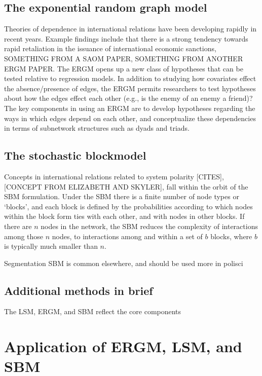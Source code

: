 \documentclass[fleqn,12pt]{wlscirep}
\begin{document}
\subsection{The exponential random graph model}

Theories of dependence in international relations have been developing rapidly in recent years. Example findings include that there is a strong tendency towards rapid retaliation in the issuance of international economic sanctions, SOMETHING FROM A SAOM PAPER, SOMETHING FROM ANOTHER ERGM PAPER.  The ERGM opens up a new class of hypotheses that can be tested relative to regression models. In addition to studying how covariates effect the absence/presence of edges, the ERGM permits researchers to test hypotheses about how the edges effect each other (e.g., is the enemy of an enemy a friend)? The key components in using an ERGM are to develop hypotheses regarding the ways in which edges depend on each other, and conceptualize these dependencies in terms of subnetwork structures such as dyads and triads.

\subsection{The stochastic blockmodel}

Concepts in international relations related to system polarity [CITES], [CONCEPT FROM ELIZABETH AND SKYLER], fall within the orbit of the SBM formulation. Under the SBM there is a finite number of node types or `blocks', and each block is defined by the probabilities according to which nodes within the block form ties with each other, and with nodes in other blocks. If there are $n$ nodes in the network, the SBM reduces the complexity of interactions among those $n$  nodes, to interactions among and within a set of $b$ blocks, where $b$ is typically much smaller than $n$. 


Segmentation SBM is common elsewhere, and should be used more in polisci

\subsection{Additional methods in brief}

The LSM, ERGM, and SBM reflect the core components

\section{Application of ERGM, LSM, and SBM}
\end{document}
